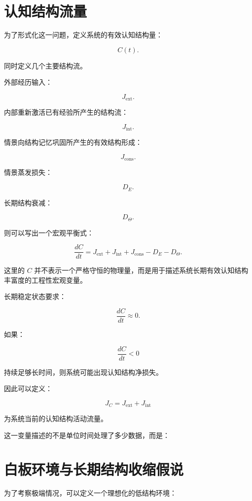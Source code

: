 \section{认知结构流量}

为了形式化这一问题，定义系统的有效认知结构量：

\[
C(t).
\]

同时定义几个主要结构流。

外部经历输入：

\[
J_{\mathrm{ext}}.
\]

内部重新激活已有经验所产生的结构流：

\[
J_{\mathrm{int}}.
\]

情景向结构记忆巩固所产生的有效结构形成：

\[
J_{\mathrm{cons}}.
\]

情景蒸发损失：

\[
D_E.
\]

长期结构衰减：

\[
D_\Theta.
\]

则可以写出一个宏观平衡式：

\[
\boxed{
\frac{dC}{dt}
=
J_{\mathrm{ext}}
+
J_{\mathrm{int}}
+
J_{\mathrm{cons}}
-
D_E
-
D_\Theta.
}
\]

这里的 $C$ 并不表示一个严格守恒的物理量，而是用于描述系统长期有效认知结构丰富度的工程性宏观变量。

长期稳定状态要求：

\[
\frac{dC}{dt}
\approx 0.
\]

如果：

\[
\frac{dC}{dt}<0
\]

持续足够长时间，则系统可能出现认知结构净损失。

因此可以定义：

\[
\boxed{
J_C
=
J_{\mathrm{ext}}
+
J_{\mathrm{int}}
}
\]

为系统当前的认知结构活动流量。

这一变量描述的不是单位时间处理了多少数据，而是：

\begin{statementbox}
\centering
{}
\end{statementbox}

\section{白板环境与长期结构收缩假说}

为了考察极端情况，可以定义一个理想化的低结构环境：

